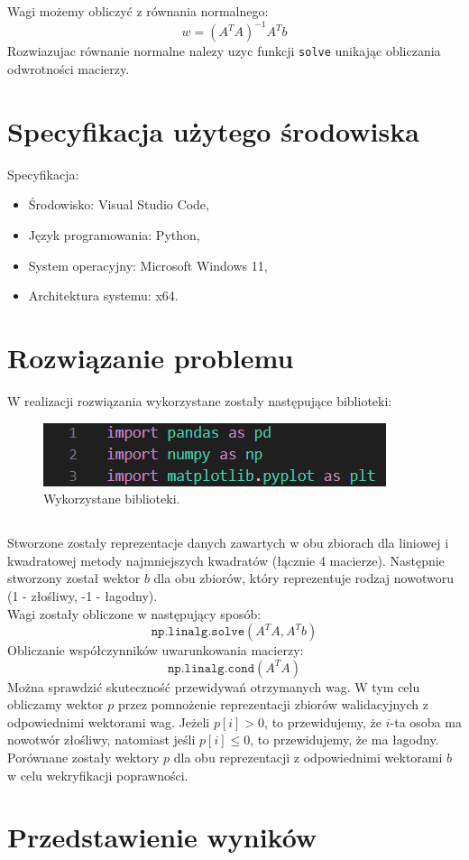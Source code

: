 \documentclass[11pt]{scrartcl}
\begin{document}
    \subsection*{}
    Wagi możemy obliczyć z równania normalnego:
    \[
        w=(A^TA)^{-1}A^Tb
    \]
    Rozwiazujac równanie normalne nalezy uzyc funkcji \texttt{solve} unikając
    obliczania odwrotności macierzy.

    \section{Specyfikacja użytego środowiska}
    Specyfikacja:

    \begin{itemize}
        \item Środowisko: Visual Studio Code,
        \item Język programowania: Python,
        \item System operacyjny: Microsoft Windows 11,
        \item Architektura systemu: x64.
    \end{itemize}

    \section{Rozwiązanie problemu}
    W realizacji rozwiązania wykorzystane zostały następujące biblioteki:
    \begin{figure}[H]
        \includegraphics[width=0.6\linewidth]{libs2.png}
        \caption{Wykorzystane biblioteki.}
    \end{figure}

    \subsection*{}
    Stworzone zostały reprezentacje danych zawartych w obu zbiorach dla liniowej
    i kwadratowej metody najmniejszych kwadratów (łącznie 4 macierze). Następnie
    stworzony został wektor $b$ dla obu zbiorów, który reprezentuje rodzaj
    nowotworu (1 - złośliwy, -1 - łagodny). \\
    Wagi zostały obliczone w następujący sposób:
    \[
        \texttt{np.linalg.solve}(A^TA,A^Tb)
    \]
    Obliczanie współczynników uwarunkowania macierzy:
    \[
        \texttt{np.linalg.cond}(A^TA)
    \]
    Można sprawdzić skuteczność przewidywań otrzymanych wag. W tym celu
    obliczamy wektor $p$ przez pomnożenie reprezentacji zbiorów walidacyjnych
    z odpowiednimi wektorami wag. Jeżeli $p[i] > 0$, to przewidujemy, że $i$-ta
    osoba ma nowotwór złośliwy, natomiast jeśli $p[i] \leq 0$, to przewidujemy,
    że ma łagodny. Porównane zostały wektory $p$ dla obu reprezentacji
    z odpowiednimi wektorami $b$ w celu wekryfikacji poprawności.

    \section{Przedstawienie wyników}
    
\end{document}
